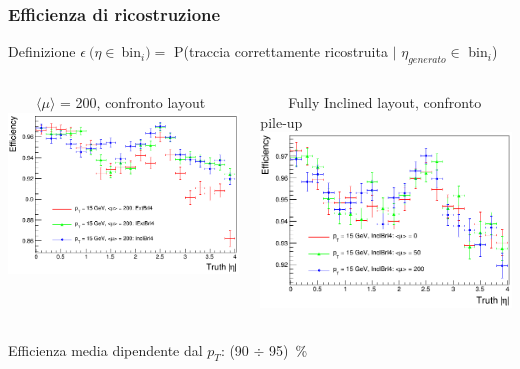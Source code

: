 \documentclass{beamer}
\begin{document}
\begin{frame}[t]
\frametitle{Efficienza di ricostruzione}
\begin{block}{\color{dred}Definizione}
$\epsilon\ (\eta \in\ $bin$_{i}) = $ P(traccia correttamente ricostruita $\vert$ $\eta_{generato} \in$ bin$_{i}$)
\end{block}
\bigskip

\begin{columns}
\begin{column}{.5\textwidth}
\centering
\ \ \ \ $\langle\mu\rangle$ = 200, confronto layout
\includegraphics[width=\textwidth]{Tracking/Mixed/pi15pu200_eff_abseta}
\end{column}
\begin{column}{.5\textwidth}
\centering
\ \ \ \ Fully Inclined layout, confronto pile-up
\includegraphics[width=\textwidth]{Tracking/InclBrl4/pi15_eff_abseta}
\end{column}
\end{columns}
\medskip
Efficienza media dipendente dal $p_{T}$: (90 $\div$ 95)\ \%
\end{frame}
\end{document}
